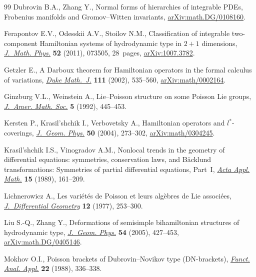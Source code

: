 \begin{thebibliography}{99}
Dubrovin B.A., Zhang Y., Normal forms of hierarchies of integrable {PDE}s,
 {F}robenius manifolds and {G}romov--{W}itten invariants,
 \href{https://arxiv.org/abs/math.DG/0108160}{arXiv:math.DG/0108160}.

Ferapontov E.V., Odesskii A.V., Stoilov N.M., Classification of integrable
 two-component {H}amiltonian systems of hydrodynamic type in {$2+1$}
 dimensions, \href{https://doi.org/10.1063/1.3602081}{\textit{J.~Math. Phys.}} \textbf{52} (2011), 073505, 28~pages,
 \href{https://arxiv.org/abs/1007.3782}{arXiv:1007.3782}.

Getzler E., A {D}arboux theorem for {H}amiltonian operators in the formal
 calculus of variations, \href{https://doi.org/10.1215/S0012-7094-02-11136-3}{\textit{Duke Math.~J.}} \textbf{111} (2002), 535--560,
 \href{https://arxiv.org/abs/math/0002164}{arXiv:math/0002164}.

Ginzburg V.L., Weinstein A., Lie--{P}oisson structure on some {P}oisson {L}ie
 groups, \href{https://doi.org/10.2307/2152773}{\textit{J.~Amer. Math. Soc.}} \textbf{5} (1992), 445--453.

Kersten P., Krasil'shchik I., Verbovetsky A., Hamiltonian operators and
 {$l^*$}-coverings, \href{https://doi.org/10.1016/j.geomphys.2003.09.010}{\textit{J.~Geom. Phys.}} \textbf{50} (2004), 273--302,
 \href{https://arxiv.org/abs/math/0304245}{arXiv:math/0304245}.

Krasil'shchik I.S., Vinogradov A.M., Nonlocal trends in the geometry of
 differential equations: symmetries, conservation laws, and {B}\"acklund
 transformations: Symmetries of partial differential equations, Part~{I},
 \href{https://doi.org/10.1007/BF00131935}{\textit{Acta Appl. Math.}} \textbf{15} (1989), 161--209.

Lichnerowicz A., Les vari\'et\'es de {P}oisson et leurs alg\`ebres de {L}ie
 associ\'ees, \href{https://doi.org/10.4310/jdg/1214433987}{\textit{J.~Differential Geometry}} \textbf{12} (1977), 253--300.

Liu S.-Q., Zhang Y., Deformations of semisimple bihamiltonian structures of
 hydrodynamic type, \href{https://doi.org/10.1016/j.geomphys.2004.11.003}{\textit{J.~Geom. Phys.}} \textbf{54} (2005), 427--453,
 \href{https://arxiv.org/abs/math.DG/0405146}{arXiv:math.DG/0405146}.

Mokhov O.I., Poisson brackets of {D}ubrovin--{N}ovikov type ({DN}-brackets),
 \href{https://doi.org/10.1007/BF01077434}{\textit{Funct. Anal. Appl.}} \textbf{22} (1988), 336--338.


\end{thebibliography}
